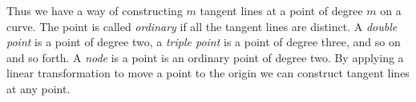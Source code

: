 Thus we have a way of constructing $m$ tangent lines at a point of degree $m$ on a curve. The point is called \emph{ordinary} if all the tangent lines are distinct. A \emph{double point} is a point of degree two, a \emph{triple point} is a point of degree three, and so on and so forth. A \emph{node} is a point is an ordinary point of degree two. By applying a linear transformation to move a point to the origin we can construct tangent lines at any point.


